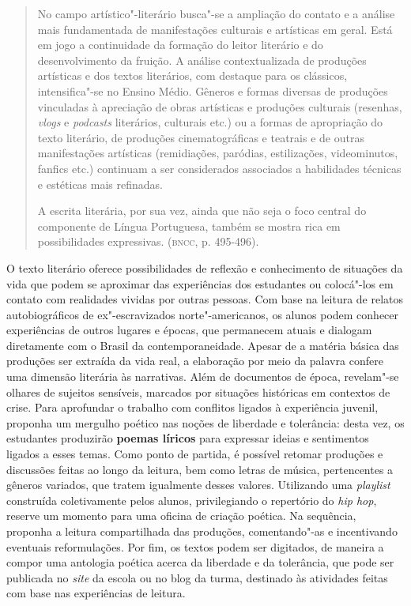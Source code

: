 \documentclass[11pt]{extarticle}
\begin{document}
\begin{quote}
No campo artístico"-literário busca"-se a ampliação do contato e a
análise mais fundamentada de manifestações culturais e artísticas em
geral. Está em jogo a continuidade da formação do leitor literário e do
desenvolvimento da fruição. A análise contextualizada de produções
artísticas e dos textos literários, com destaque para os clássicos,
intensifica"-se no Ensino Médio. Gêneros e formas diversas de produções
vinculadas à apreciação de obras artísticas e produções culturais
(resenhas, \emph{vlogs} e \emph{podcasts} literários, culturais etc.) ou a formas de
apropriação do texto literário, de produções cinematográficas e teatrais
e de outras manifestações artísticas (remidiações, paródias,
estilizações, videominutos, fanfics etc.) continuam a ser considerados
associados a habilidades técnicas e estéticas mais refinadas.

A escrita literária, por sua vez, ainda que não seja o foco central do
componente de Língua Portuguesa, também se mostra rica em possibilidades
expressivas. (\textsc{bncc}, p. 495-496).
\end{quote}

  O texto literário oferece possibilidades de reflexão e conhecimento de
  situações da vida que podem se aproximar das experiências dos
  estudantes ou colocá"-los em contato com realidades vividas por outras
  pessoas. Com base na leitura de relatos autobiográficos de
  ex"-escravizados norte"-americanos, os alunos podem conhecer
  experiências de outros lugares e épocas, que permanecem atuais e
  dialogam diretamente com o Brasil da contemporaneidade. Apesar de a
  matéria básica das produções ser extraída da vida real, a elaboração
  por meio da palavra confere uma dimensão literária às narrativas. Além
  de documentos de época, revelam"-se olhares de sujeitos sensíveis,
  marcados por situações históricas em contextos de crise. Para
  aprofundar o trabalho com conflitos ligados à experiência juvenil,
  proponha um mergulho poético nas noções de liberdade e tolerância:
  desta vez, os estudantes produzirão \textbf{poemas líricos} para
  expressar ideias e sentimentos ligados a esses temas. Como ponto de
  partida, é possível retomar produções e discussões feitas ao longo da
  leitura, bem como letras de música, pertencentes a gêneros variados,
  que tratem igualmente desses valores. Utilizando uma \emph{playlist}
  construída coletivamente pelos alunos, privilegiando o repertório do
  \emph{hip hop}, reserve um momento para uma oficina de criação
  poética. Na sequência, proponha a leitura compartilhada das produções,
  comentando"-as e incentivando eventuais reformulações. Por fim, os
  textos podem ser digitados, de maneira a compor uma antologia poética
  acerca da liberdade e da tolerância, que pode ser publicada no
  \emph{site} da escola ou no blog da turma, destinado às atividades
  feitas com base nas experiências de leitura.
\end{document}
